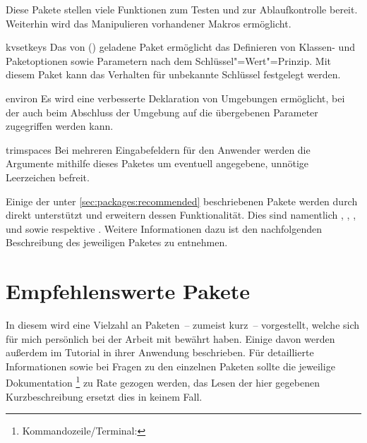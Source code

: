 \begin{packages}
  Diese Pakete stellen viele Funktionen zum Testen und zur Ablaufkontrolle 
  bereit. Weiterhin wird das Manipulieren vorhandener Makros ermöglicht.
\item[kvsetkeys]
  Das von () geladene Paket 
   ermöglicht das Definieren von Klassen- und Paketoptionen 
  sowie Parametern nach dem Schlüssel"=Wert"=Prinzip. Mit diesem Paket kann das 
  Verhalten für unbekannte Schlüssel festgelegt werden.
\item[environ]
  Es wird eine verbesserte Deklaration von Umgebungen ermöglicht, bei der auch 
  beim Abschluss der Umgebung auf die übergebenen Parameter zugegriffen werden 
  kann. 
\item[trimspaces]
  Bei mehreren Eingabefeldern für den Anwender werden die Argumente mithilfe 
  dieses Paketes um eventuell angegebene, unnötige Leerzeichen befreit.
\end{packages}



%
Einige der unter \autoref{sec:packages:recommended} beschriebenen Pakete werden 
durch \TUDScript direkt unterstützt und erweitern dessen Funktionalität. Dies
sind namentlich , , , 
 und  sowie  respektive 
. Weitere Informationen dazu ist den nachfolgenden 
Beschreibung des jeweiligen Paketes zu entnehmen.



\section{%
  Empfehlenswerte Pakete%
  \label{sec:packages:recommended}%
}
%
In diesem \autorefname wird eine Vielzahl an Paketen~-- zumeist kurz~-- 
vorgestellt, welche sich für mich persönlich bei der Arbeit mit  
bewährt haben. Einige davon werden außerdem im Tutorial  in 
ihrer Anwendung beschrieben. Für detaillierte Informationen sowie bei Fragen zu 
den einzelnen Paketen sollte die jeweilige Dokumentation%
\footnote{Kommandozeile/Terminal: }
zu Rate gezogen werden, das Lesen der hier gegebenen Kurzbeschreibung ersetzt 
dies in keinem Fall.
%
\NewExpandableDocumentCommand{}



